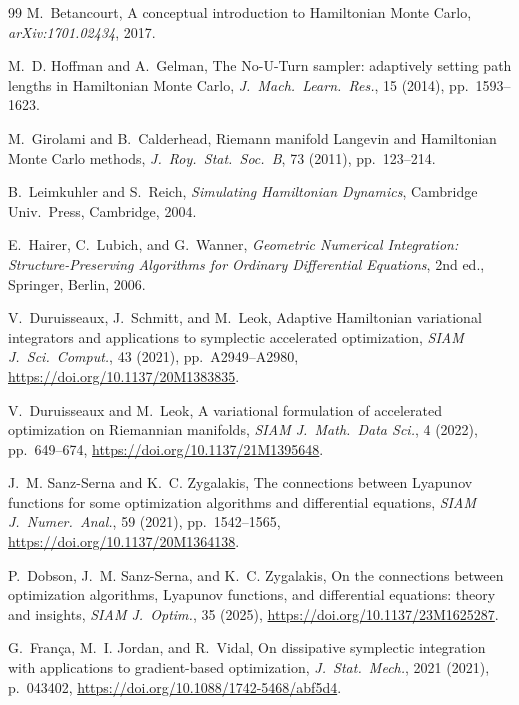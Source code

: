 \documentclass[11pt]{article}
\theoremstyle{definition}
\begin{document}
\begin{thebibliography}{99}
M.~Betancourt,
A conceptual introduction to Hamiltonian Monte Carlo,
\textit{arXiv:1701.02434}, 2017.

M.~D. Hoffman and A.~Gelman,
The No-U-Turn sampler: adaptively setting path lengths in Hamiltonian
Monte Carlo,
\textit{J.\ Mach.\ Learn.\ Res.}, 15 (2014), pp.~1593--1623.

M.~Girolami and B.~Calderhead,
Riemann manifold Langevin and Hamiltonian Monte Carlo methods,
\textit{J.\ Roy.\ Stat.\ Soc.\ B}, 73 (2011), pp.~123--214.

B.~Leimkuhler and S.~Reich,
\textit{Simulating Hamiltonian Dynamics},
Cambridge Univ.\ Press, Cambridge, 2004.

E.~Hairer, C.~Lubich, and G.~Wanner,
\textit{Geometric Numerical Integration: Structure-Preserving Algorithms
for Ordinary Differential Equations}, 2nd ed.,
Springer, Berlin, 2006.

V.~Duruisseaux, J.~Schmitt, and M.~Leok,
Adaptive Hamiltonian variational integrators and applications to
symplectic accelerated optimization,
\textit{SIAM J.\ Sci.\ Comput.}, 43 (2021), pp.~A2949--A2980,
\url{https://doi.org/10.1137/20M1383835}.

V.~Duruisseaux and M.~Leok,
A variational formulation of accelerated optimization on Riemannian
manifolds,
\textit{SIAM J.\ Math.\ Data Sci.}, 4 (2022), pp.~649--674,
\url{https://doi.org/10.1137/21M1395648}.

J.~M. Sanz-Serna and K.~C. Zygalakis,
The connections between Lyapunov functions for some optimization
algorithms and differential equations,
\textit{SIAM J.\ Numer.\ Anal.}, 59 (2021), pp.~1542--1565,
\url{https://doi.org/10.1137/20M1364138}.

P.~Dobson, J.~M. Sanz-Serna, and K.~C. Zygalakis,
On the connections between optimization algorithms, Lyapunov functions,
and differential equations: theory and insights,
\textit{SIAM J.\ Optim.}, 35 (2025),
\url{https://doi.org/10.1137/23M1625287}.

G.~Fran\c{c}a, M.~I. Jordan, and R.~Vidal,
On dissipative symplectic integration with applications to
gradient-based optimization,
\textit{J.\ Stat.\ Mech.}, 2021 (2021), p.~043402,
\url{https://doi.org/10.1088/1742-5468/abf5d4}.


\end{thebibliography}
\end{document}
